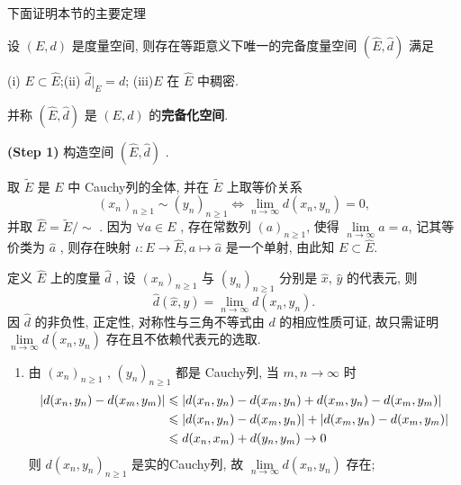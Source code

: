     下面证明本节的主要定理

    \begin{Theorem}[度量空间的完备化]
         设 $ (E, d) $ 是度量空间, 则存在等距意义下唯一的完备度量空间 $ (\widehat{E}, \hat{d}) $ 满足

         (i) $ E\subset \widehat{E} $;\hspace{6em}(ii) $ \hat{d}|_{E}=d $;\hspace{6em}  (iii)$ E $ 在 $ \widehat{E} $ 中稠密.

         \noindent 并称 $ (\widehat{E}, \hat{d}) $ 是 $ (E, d) $ 的\textbf{完备化空间}.
    \end{Theorem}
    \begin{Proof}

        \textbf{(Step 1)} 构造空间 $ (\widehat{E}, \hat{d}) $ .

        取 $ \widetilde{E} $ 是 $ E $ 中 Cauchy列的全体, 并在 $ \widetilde{E} $ 上取等价关系
        \[
            (x_{n})_{n\geqslant1}\sim (y_{n})_{n\geqslant1}\Longleftrightarrow \lim_{n\to\infty}d(x_{n},y_{n})=0,
        \]
        并取 $ \widehat{E}=\widetilde{E}/\sim $ . 因为 $ \forall a\in E $ , 存在常数列  $ (a)_{n\geqslant1} $, 使得 $ \lim\limits_{n\to\infty}a=a $, 记其等价类为 $ \hat{a} $ , 则存在映射 $ \iota :E\to\widehat{E}, a\mapsto \hat{a} $ 是一个单射, 由此知 $ E\subset\widehat{E} $.

        定义 $ \widehat{E} $ 上的度量 $ \hat{d} $ , 设 $ (x_{n})_{n\geqslant1} $ 与 $ (y_{n})_{n\geqslant1} $ 分别是 $ \hat{x} $, $ \hat{y} $ 的代表元, 则
        \[
            \hat{d}(\hat{x}, \hat{y})=\lim_{n\to\infty}d(x_{n},y_{n}).
        \]
        因 $ \hat{d} $ 的非负性, 正定性, 对称性与三角不等式由 $ d $ 的相应性质可证, 故只需证明 $ \lim\limits_{n\to\infty}d(x_{n}, y_{n}) $ 存在且不依赖代表元的选取.

        \begin{enumerate}[(1)]

            \item 由 $ (x_{n})_{n\geqslant1} $ , $ (y_{n})_{n\geqslant1} $ 都是 Cauchy列, 当 $ m, n\to\infty $ 时
            \[
                \begin{aligned}
                    \left| d(x_{n}, y_{n})-d(x_{m}, y_{m}) \right|  & \leqslant \left| d(x_{n}, y_{n})-d(x_{m}, y_{n})+ d(x_{m}, y_{n})-d(x_{m}, y_{m}) \right| \\
                    & \leqslant \left| d(x_{n}, y_{n})-d(x_{m}, y_{n}) \right| +\left| d(x_{m}, y_{n})-d(x_{m}, y_{m}) \right| \\
                    & \leqslant d(x_{n}, x_{m})+d(y_{n}, y_{m})\to 0
                \end{aligned}
            \]
            则 $ d(x_{n}, y_{n})_{n\geqslant1} $ 是实的Cauchy列,  故 $ \lim\limits_{n\to\infty}d(x_{n}, y_{n}) $ 存在;


\end{enumerate}
\end{Proof}
